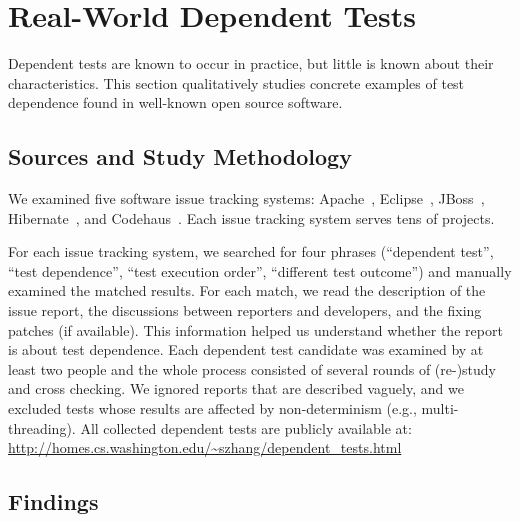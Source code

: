 \section{Real-World Dependent Tests}
\label{sec:study}

\newcommand{\unum}{{{14}}\xspace}
\newcommand{\svratio}{{{61}}}
\newcommand{\svnum}{{{59}}\xspace}
\newcommand{\unfixed}{{{58}}\xspace}


Dependent tests are known to occur in practice, but little is known about
their characteristics.  This section qualitatively studies
concrete examples of test dependence found in
well-known open source software. 


\subsection{Sources and Study Methodology}

We examined five
software issue
tracking systems: Apache~\cite{apachebug},
Eclipse~\cite{eclipsebug}, JBoss~\cite{jbossbug},
Hibernate~\cite{hibernatebug}, and Codehaus~\cite{codehausbug}.
Each issue tracking system serves tens of projects.

For each issue tracking system, we searched for four phrases
(``dependent test'', ``test dependence'', ``test execution order'',
``different test outcome'') and manually examined the matched results. For each match, we read the
description of the issue report, the discussions between reporters
and developers, and the fixing patches (if available). This information
helped us understand whether the report is about test dependence.
Each dependent test candidate was examined by
at least two people and the whole process consisted of several
rounds of (re-)study and cross checking. We ignored reports
that are described vaguely, and we excluded tests whose results are
affected by non-determinism (e.g., multi-threading).
All collected dependent tests are publicly available 
at: \url{http://homes.cs.washington.edu/~szhang/dependent\_tests.html}


\subsection{Findings}
\label{sec:studyfindings}

